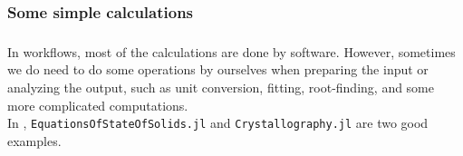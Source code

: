 \subsubsection{Some simple calculations}

\begin{frame}
    \frametitle{}

    In \ab{} workflows, most of the calculations are done by \ab{} software.
    However, sometimes we do need to do some operations by ourselves when preparing the input
    or analyzing the output, such as unit conversion, fitting, root-finding, and some more
    complicated computations.\\

    In \express{}, \texttt{EquationsOfStateOfSolids.jl} and \texttt{Crystallography.jl}
    are two good examples.\\



\end{frame}

